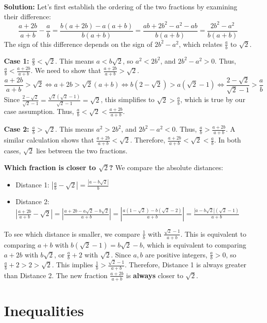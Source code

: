 \textbf{Solution:}
Let's first establish the ordering of the two fractions by examining their difference:
\[
\frac{a + 2b}{a + b} - \frac{a}{b} = \frac{b(a + 2b) - a(a + b)}{b(a + b)} = \frac{ab + 2b^2 - a^2 - ab}{b(a + b)} = \frac{2b^2 - a^2}{b(a + b)}
\]
The sign of this difference depends on the sign of $2b^2 - a^2$, which relates $\frac{a}{b}$ to $\sqrt{2}$.

\textbf{Case 1: $\frac{a}{b} < \sqrt{2}$}. This means $a < b\sqrt{2}$, so $a^2 < 2b^2$, and $2b^2 - a^2 > 0$.
Thus, $\frac{a}{b} < \frac{a+2b}{a+b}$. We need to show that $\frac{a+2b}{a+b} > \sqrt{2}$.
\[
\frac{a + 2b}{a + b} > \sqrt{2} \iff a + 2b > \sqrt{2}(a + b) \iff b(2 - \sqrt{2}) > a(\sqrt{2} - 1) \iff \frac{2 - \sqrt{2}}{\sqrt{2} - 1} > \frac{a}{b}
\]
Since $\frac{2 - \sqrt{2}}{\sqrt{2} - 1} = \frac{\sqrt{2}(\sqrt{2} - 1)}{\sqrt{2} - 1} = \sqrt{2}$, this simplifies to $\sqrt{2} > \frac{a}{b}$, which is true by our case assumption. Thus, $\frac{a}{b} < \sqrt{2} < \frac{a + 2b}{a + b}$.

\textbf{Case 2: $\frac{a}{b} > \sqrt{2}$}. This means $a^2 > 2b^2$, and $2b^2 - a^2 < 0$.
Thus, $\frac{a}{b} > \frac{a+2b}{a+b}$. A similar calculation shows that $\frac{a+2b}{a+b} < \sqrt{2}$.
Therefore, $\frac{a+2b}{a+b} < \sqrt{2} < \frac{a}{b}$. In both cases, $\sqrt{2}$ lies between the two fractions.

\textbf{Which fraction is closer to $\sqrt{2}$?}
We compare the absolute distances:
\begin{itemize}
\item Distance 1: $\left|\frac{a}{b} - \sqrt{2}\right| = \frac{|a - b\sqrt{2}|}{b}$
\item Distance 2: $\left|\frac{a + 2b}{a + b} - \sqrt{2}\right| = \left|\frac{a + 2b - a\sqrt{2} - b\sqrt{2}}{a + b}\right| = \left|\frac{a(1-\sqrt{2}) - b(\sqrt{2}-2)}{a + b}\right| = \frac{|a - b\sqrt{2}|(\sqrt{2}-1)}{a+b}$
\end{itemize}
To see which distance is smaller, we compare $\frac{1}{b}$ with $\frac{\sqrt{2}-1}{a+b}$.
This is equivalent to comparing $a+b$ with $b(\sqrt{2}-1) = b\sqrt{2} - b$, which is equivalent to comparing $a+2b$ with $b\sqrt{2}$, or $\frac{a}{b} + 2$ with $\sqrt{2}$.
Since $a, b$ are positive integers, $\frac{a}{b} > 0$, so $\frac{a}{b} + 2 > 2 > \sqrt{2}$.
This implies $\frac{1}{b} > \frac{\sqrt{2}-1}{a+b}$.
Therefore, Distance 1 is always greater than Distance 2. The new fraction $\frac{a+2b}{a+b}$ is \textbf{always} closer to $\sqrt{2}$.

\section{Inequalities}

